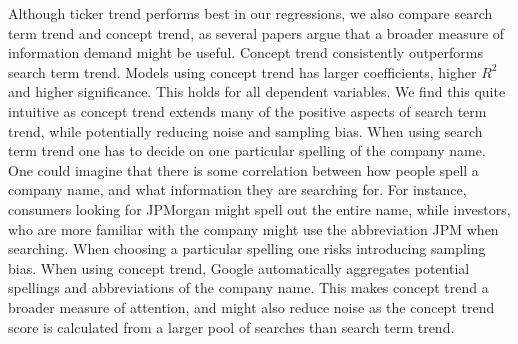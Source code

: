 Although ticker trend performs best in our regressions, we also compare search term trend and concept trend, as several papers argue that a broader measure of information demand might be useful. Concept trend consistently outperforms search term trend. Models using concept trend has larger coefficients, higher $R^2$ and higher significance. This holds for all dependent variables. We find this quite intuitive as concept trend extends many of the positive aspects of search term trend, while potentially reducing noise and sampling bias. When using search term trend one has to decide on one particular spelling of the company name. One could imagine that there is some correlation between how people spell a company name, and what information they are searching for. For instance, consumers looking for JPMorgan might spell out the entire name, while investors, who are more familiar with the company might use the abbreviation JPM when searching. When choosing a particular spelling one risks introducing sampling bias. When using concept trend, Google automatically aggregates potential spellings and abbreviations of the company name. This makes concept trend a broader measure of attention, and might also reduce noise as the concept trend score is calculated from a larger pool of searches than search term trend.



